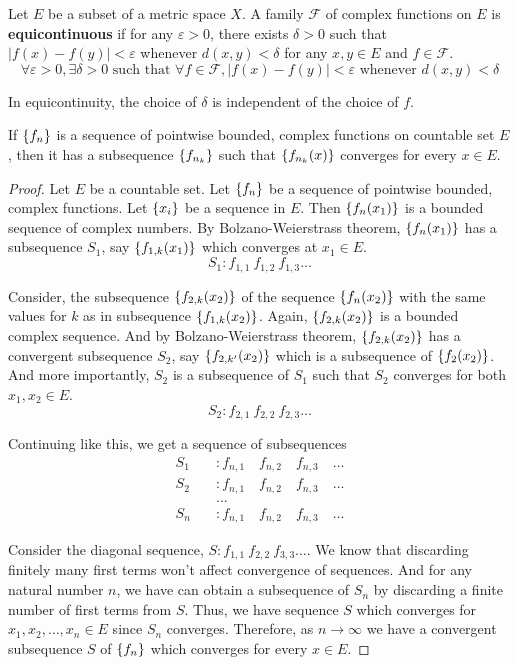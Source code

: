 \begin{definition}
	Let $E$ be a subset of a metric space $X$.
	A family $\mathscr{F}$ of complex functions on $E$ is \textbf{equicontinuous} if for any $\varepsilon > 0$, there exists $\delta > 0$ such that $|f(x)-f(y)| < \varepsilon$ whenever $d(x,y) < \delta$ for any $x,y \in E$ and $f \in \mathscr{F}$.
	\[ \forall \varepsilon > 0, \exists \delta > 0 \text{ such that } \forall f \in \mathscr{F}, |f(x)-f(y)| < \varepsilon \text{ whenever } d(x,y) < \delta \]
	\begin{commentary}
		In equicontinuity, the choice of $\delta$ is independent of the choice of $f$.
	\end{commentary}
\end{definition}

\begin{theorem}
	If $\left\{f_n\right\}$ is a sequence of pointwise bounded, complex functions on countable set $E$, then it has a subsequence $\left\{f_{n_k}\right\}$ such that $\left\{f_{n_k}(x)\right\}$ converges for every $x \in E$.
\end{theorem}
\begin{proof}
	Let $E$ be a countable set.
	Let $\left\{f_n\right\}$ be a sequence of pointwise bounded, complex functions.
	Let $\left\{x_i\right\}$ be a sequence in $E$.
	Then $\left\{f_n(x_1)\right\}$ is a bounded sequence of complex numbers.
	By Bolzano-Weierstrass theorem,  $\left\{f_n(x_1)\right\}$ has a subsequence $S_1$, say $\left\{f_{1,k}(x_1)\right\}$ which converges at $x_1 \in E$.
	\[ S_1 : f_{1,1}\ f_{1,2}\ f_{1,3} \dots \]

	Consider, the subsequence $\left\{f_{2,k}(x_2)\right\}$ of the sequence $\left\{f_n(x_2)\right\}$ with the same values for $k$ as in subsequence $\left\{f_{1,k}(x_2)\right\}$.
	Again, $\left\{f_{2,k}(x_2)\right\}$ is a bounded complex sequence.
	And by Bolzano-Weierstrass theorem, $\left\{f_{2,k}(x_2)\right\}$ has a convergent subsequence $S_2$, say $\left\{f_{2,k'}(x_2)\right\}$ which is a subsequence of $\left\{f_2(x_2)\right\}$.
	And more importantly, $S_2$ is a subsequence of $S_1$ such that $S_2$ converges for both $x_1,x_2 \in E$.
	\[ S_2 : f_{2,1}\ f_{2,2}\ f_{2,3} \dots \]

	Continuing like this, we get a sequence of subsequences
	\begin{align*}
		S_1 \quad & : f_{n,1}\quad f_{n,2}\quad f_{n,3}\quad \dots \\
		S_2 \quad & : f_{n,1}\quad f_{n,2}\quad f_{n,3}\quad \dots \\
		 & \dots \\
		S_n \quad & : f_{n,1}\quad f_{n,2}\quad f_{n,3}\quad \dots
	\end{align*}

	Consider the diagonal sequence, $S : f_{1,1}\ f_{2,2}\ f_{3,3} \dots $.
	We know that discarding finitely many first terms won't affect convergence of sequences.
	And for any natural number $n$, we have can obtain a subsequence of $S_n$ by discarding a finite number of first terms from $S$.
	Thus, we have sequence $S$ which converges for $x_1,x_2,\dots,x_n \in E$ since $S_n$ converges.
	Therefore, as $n \to \infty$ we have a convergent subsequence $S$ of $\left\{f_n\right\}$ which converges for every $x \in E$.
\end{proof}

